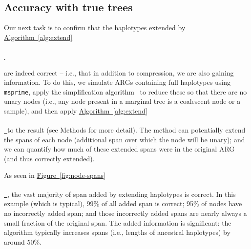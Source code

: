 \documentclass[10pt,twoside,lineno]{gsajnl}
\newcommand{\msprime}{\texttt{msprime}}
\newcommand{\algorithmref}[2][]{%
	\hyperref[{#2}]{%
		Algorithm~\ref*{#2}%
		\ifx\\#1\\%
		\else
		\,#1%
		\fi
	}%
}
\newcommand*{\figref}[2][]{%
	\hyperref[{#2}]{%
		Figure~\ref*{#2}%
		\ifx\\#1\\%
		\else
		\,#1%
		\fi
	}%
}
\begin{document}
\subsection{Accuracy with true trees}


Our next task is to confirm that the haplotypes extended by \algorithmref{alg:extend}
are indeed correct -- i.e., that in addition to compression, we are also gaining information.
To do this, 
we simulate ARGs containing full haplotypes using \msprime{},
apply the simplification algorithm~\citep{kelleher2018efficient,wong2024general}
to reduce these so that there are no unary nodes
(i.e., any node present in a marginal tree is a coalescent node or a sample),
and then apply \algorithmref{alg:extend} to the result
(see Methods for more detail).
The method can potentially extend the spans of each node
(additional span over which the node will be unary);
and we can quantify how much of these extended spans were in the original ARG
(and thus correctly extended).

%
%

As seen in \figref{fig:node-spans},
the vast majority of span added by extending haplotypes is correct.
In this example (which is typical),
99\% of all added span is correct;
95\% of nodes have no incorrectly added span;
and those incorrectly added spans are nearly always a small fraction of the original span.
The added information is significant:
the algorithm typically increases spans (i.e., lengths of ancestral haplotypes)
by around 50\%.
\end{document}
